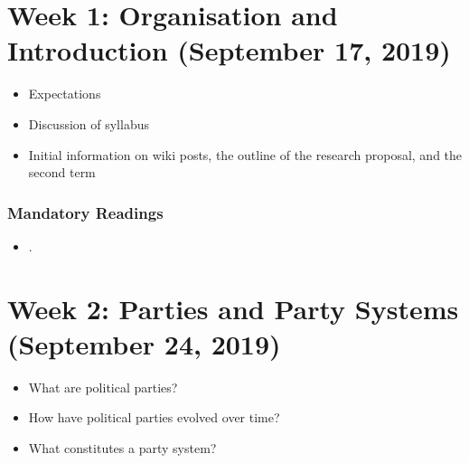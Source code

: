 \documentclass[abstract=on,parskip=full,headings=standardclasses,fontsize=11pt,paper=a4]{scrartcl}
\begin{document}
\begin{itemize}
\end{itemize}



\newpage

\tableofcontents

\section{Week 1: Organisation and Introduction (September 17, 2019)}

\begin{itemize}
\renewcommand\labelitemi{--}
\item Expectations
\item Discussion of syllabus
\item Initial information on wiki posts, the outline of the  research proposal, and the second term 
\end{itemize}


\subsubsection*{Mandatory Readings}
\begin{itemize}
\item {}.
\end{itemize}


\section{Week 2: Parties and Party Systems (September 24, 2019)}

\begin{itemize}
\renewcommand\labelitemi{--}
\item  What are political parties?
\item How have political parties evolved over time?
\item What constitutes a party system?
\end{itemize}
\end{document}
